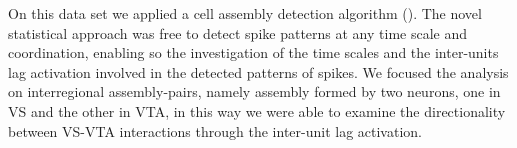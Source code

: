 On this data set we applied a cell assembly detection algorithm (\cite{RussoDurstewitz}). %
The novel statistical approach was free to detect spike patterns at any time scale and coordination, enabling so the investigation of the time scales and the inter-units lag activation involved in the detected patterns of spikes. %
We focused the analysis on interregional assembly-pairs, namely assembly formed by two neurons, one in VS and the other in VTA, in this way we were able to examine the directionality between VS-VTA interactions through the inter-unit lag activation.\\%
